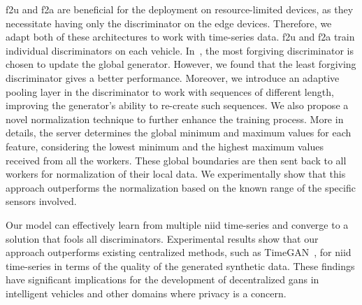 

\gls*{f2u} and \gls*{f2a} are beneficial for the deployment on resource-limited devices, as they necessitate having only the discriminator on the edge devices. Therefore, we adapt both of these architectures to work with time-series data. \gls*{f2u} and \gls*{f2a} train individual discriminators on each vehicle. In~\cite{yonetani_decentralized_2019}, the most forgiving discriminator is chosen to update the global generator. However, we found that the least forgiving discriminator gives a better performance. Moreover, we introduce an adaptive pooling layer in the discriminator to work with sequences of different  length, improving the generator's ability to re-create such sequences.
%
We also propose a novel normalization technique to further enhance the training process. More in details, the server determines the global minimum and maximum values for each feature, considering the lowest minimum and the highest maximum values received from all the workers. These global boundaries are then sent back to all workers for normalization of their local data. We experimentally show that this approach outperforms the normalization based on the known range of the specific sensors involved.

Our model can effectively learn from multiple \gls*{niid} time-series and converge to a solution that fools all discriminators. Experimental results show that our approach outperforms existing centralized methods, such as TimeGAN~\cite{yoon_time-series_2019}, for \gls*{niid} time-series in terms of the quality of the generated synthetic data. These findings have significant implications for the development of decentralized \glspl*{gan} in intelligent vehicles and other domains where privacy is a concern.
